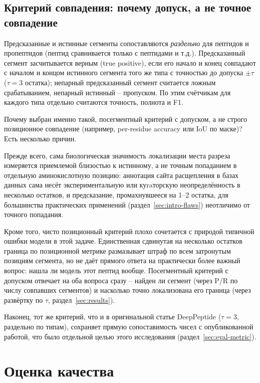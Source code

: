 \documentclass{article}
\begin{document}
\subsection{Критерий совпадения: почему допуск, а не точное совпадение}

Предсказанные и истинные сегменты сопоставляются \emph{раздельно} для пептидов и пропептидов (пептид сравнивается только с пептидами и т.д.). Предсказанный сегмент засчитывается верным (true positive), если его начало и конец совпадают с началом и концом истинного сегмента того же типа с точностью до допуска $\pm\tau$ ($\tau=3$ остатка); непарный предсказанный сегмент считается ложным срабатыванием, непарный истинный -- пропуском. По этим счётчикам для каждого типа отдельно считаются точность, полнота и F1.

Почему выбран именно такой, посегментный критерий с допуском, а не строго позиционное совпадение (например, per-residue accuracy или IoU по маске)? Есть несколько причин.

Прежде всего, сама биологическая значимость локализации места разреза измеряется приемлемой близостью к истинному, а не точным попаданием в отдельную аминокислотную позицию: аннотация сайта расщепления в базах данных сама несёт экспериментальную или куraторскую неопределённость в несколько остатков, и предсказание, промахнувшееся на 1--2 остатка, для большинства практических применений (раздел~\ref{sec:intro-flaws}) неотличимо от точного попадания.

Кроме того, чисто позиционный критерий плохо сочетается с природой типичной ошибки модели в этой задаче. Единственная сдвинутая на несколько остатков граница по позиционной метрике размазывает штраф по всем затронутым позициям сегмента, но не даёт прямого ответа на практически более важный вопрос: нашла ли модель этот пептид вообще. Посегментный критерий с допуском отвечает на оба вопроса сразу -- найден ли сегмент (через P/R по числу совпавших сегментов) и насколько точно локализована его граница (через развёртку по $\tau$, раздел~\ref{sec:results}).

Наконец, тот же критерий, что и в оригинальной статье DeepPeptide ($\tau=3$, раздельно по типам), сохраняет прямую сопоставимость чисел с опубликованной работой, что было отдельной целью этого исследования (раздел~\ref{sec:eval-metric}).

\section{Оценка качества}
\label{sec:eval}
\end{document}
